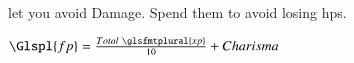 \subsubsection{}
let you avoid Damage.
Spend them to avoid losing \glspl{hp}.

\begin{center}
$\Glspl{fp} = \frac{Total~\glsfmtplural{xp}}{10} + Charisma$
\end{center}
